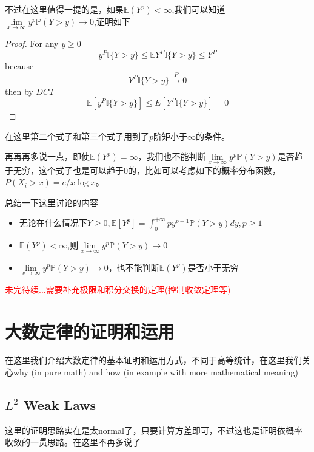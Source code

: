 \documentclass{article}
\newtheorem*{proof}{Proof}
\begin{document}
	\par 不过在这里值得一提的是，如果$\mathbb{E}(Y^{p})<\infty$,我们可以知道$\underset{x\to\infty}{\lim}y^p\mathbb{P}(Y>y)\to 0$,证明如下
	\begin{proof}
		For any \( y \geqslant 0 \)
		\[
		y^P \mathbb{I}\{Y>y\} \leqslant \mathbb{E} Y^P \mathbb{I}\{Y>y\} \leqslant Y^P
		\]
		because
		\[
		Y^P \mathbb{I}\{Y>y\} \stackrel{P}{\longrightarrow} 0
		\]
		then by \( D C T \)
		\[
		\mathbb{E}\left[y^P \mathbb{I}\{Y>y\}\right] \leqslant E\left[Y^P \mathbb{I}\{Y>y\}\right]=0
		\]
	\end{proof}
在这里第二个式子和第三个式子用到了$p$阶矩小于$\infty$的条件。
\par 再再再多说一点，即使$\mathbb{E}(Y^p)=\infty$，我们也不能判断$\underset{x\to\infty}{\lim}y^p\mathbb{P}(Y>y)$是否趋于无穷，这个式子也是可以趋于$0$的，比如可以考虑如下的概率分布函数，$P\left(X_i>x\right)=e / x \log x$。
\par 总结一下这里讨论的内容
\begin{itemize}
	\item 无论在什么情况下$Y \geqslant 0, \mathbb{E} \left[Y^p\right]=\int_0^{+\infty} p y^{p-1} \mathbb{P}(Y>y) d y, p \geqslant 1$
	\item $\mathbb{E}(Y^p)<\infty$,则$\underset{x\to\infty}{\lim}y^p\mathbb{P}(Y>y)\to 0$
	\item $\underset{x\to\infty}{\lim}y^p\mathbb{P}(Y>y)\to 0$，也不能判断$\mathbb{E}(Y^p)$是否小于无穷
\end{itemize}
\textcolor{red}{未完待续...需要补充极限和积分交换的定理(控制收敛定理等)}
\section{大数定律的证明和运用}
在这里我们介绍大数定律的基本证明和运用方式，不同于高等统计，在这里我们关心why (in pure math) and how (in example with more mathematical meaning)
\subsection{$L^2$ Weak Laws}
这里的证明思路实在是太normal了，只要计算方差即可，不过这也是证明依概率收敛的一贯思路。在这里不再多说了
\end{document}
